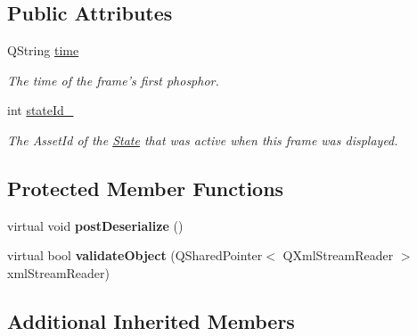 \subsection*{Public Attributes}
\begin{DoxyCompactItemize}
\item 
\hypertarget{class_picto_1_1_frame_data_unit_aa219e2d7d4fe5eda0e96ba38d2ac9bdf}{Q\-String \hyperlink{class_picto_1_1_frame_data_unit_aa219e2d7d4fe5eda0e96ba38d2ac9bdf}{time}}\label{class_picto_1_1_frame_data_unit_aa219e2d7d4fe5eda0e96ba38d2ac9bdf}

\begin{DoxyCompactList}\small\item\em The time of the frame's first phosphor. \end{DoxyCompactList}\item 
\hypertarget{class_picto_1_1_frame_data_unit_aed29a29a44838925c814797d3ea02316}{int \hyperlink{class_picto_1_1_frame_data_unit_aed29a29a44838925c814797d3ea02316}{state\-Id\-\_\-}}\label{class_picto_1_1_frame_data_unit_aed29a29a44838925c814797d3ea02316}

\begin{DoxyCompactList}\small\item\em The Asset\-Id of the \hyperlink{class_picto_1_1_state}{State} that was active when this frame was displayed. \end{DoxyCompactList}\end{DoxyCompactItemize}
\subsection*{Protected Member Functions}
\begin{DoxyCompactItemize}
\item 
\hypertarget{class_picto_1_1_frame_data_unit_abd235a7b0e98c0f291343935e23376ad}{virtual void {\bfseries post\-Deserialize} ()}\label{class_picto_1_1_frame_data_unit_abd235a7b0e98c0f291343935e23376ad}

\item 
\hypertarget{class_picto_1_1_frame_data_unit_a62d02bd4ca56727a087252d119dc6317}{virtual bool {\bfseries validate\-Object} (Q\-Shared\-Pointer$<$ Q\-Xml\-Stream\-Reader $>$ xml\-Stream\-Reader)}\label{class_picto_1_1_frame_data_unit_a62d02bd4ca56727a087252d119dc6317}

\end{DoxyCompactItemize}
\subsection*{Additional Inherited Members}


